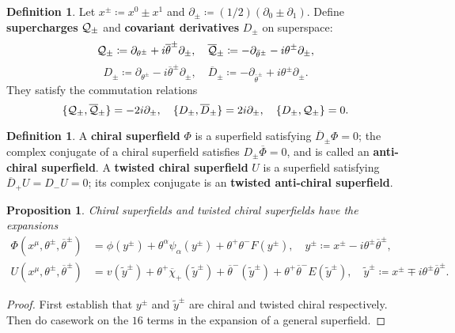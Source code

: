 \documentclass{report}
\theoremstyle{plain}
\newtheorem{proposition}[theorem]{Proposition}
\theoremstyle{definition}
\newtheorem{definition}[theorem]{Definition}
\theoremstyle{remark}
\newcommand{\di}{\partial}
\newcommand{\cnj}{\overline}
\begin{document}
\begin{definition}
  Let $x^\pm \coloneqq x^0 \pm x^1$ and $\di_\pm \coloneqq (1/2)(\di_0
  \pm \di_1)$. Define {\bf supercharges} $\cal Q_\pm$ and {\bf
    covariant derivatives} $D_\pm$ on superspace:
  \[ {\cal Q}_\pm \coloneqq \di_{\theta^\pm} + i \cnj{\theta}^\pm \di_\pm, \quad \cnj{\cal Q}_\pm \coloneqq -\di_{\bar\theta^\pm} - i\theta^\pm \di_\pm, \]
  \[ D_\pm \coloneqq \di_{\theta^\pm} - i\cnj\theta^\pm \di_\pm, \quad \cnj D_\pm \coloneqq -\di_{\bar\theta^\pm} + i\theta^\pm \di_\pm. \]
  They satisfy the commutation relations
  \[ \{{\cal Q}_\pm, \cnj{\cal Q}_\pm\} = -2i\di_\pm, \quad \{D_\pm, \cnj D_\pm\} = 2i\di_\pm, \quad \{D_\pm, {\cal Q}_\pm\} = 0. \]
\end{definition}

\begin{definition}
  A {\bf chiral superfield} $\Phi$ is a superfield satisfying $\cnj
  D_\pm \Phi = 0$; the complex conjugate of a chiral superfield
  satisfies $D_\pm \cnj\Phi = 0$, and is called an {\bf anti-chiral
    superfield}. A {\bf twisted chiral superfield} $U$ is a superfield
  satisfying $\cnj D_+ U = D_- U = 0$; its complex conjugate is an
  {\bf twisted anti-chiral superfield}.
\end{definition}

\begin{proposition} \label{thm:chiral-superfield-expansion}
  Chiral superfields and twisted chiral superfields have the
  expansions
  \begin{align*}
    \Phi(x^\mu, \theta^\pm, \cnj\theta^\pm) &= \phi(y^\pm) + \theta^\alpha \psi_\alpha(y^\pm) + \theta^+\theta^-F(y^\pm), \quad y^\pm \coloneqq x^\pm - i\theta^\pm \cnj\theta^\pm, \\
    U(x^\mu, \theta^\pm, \cnj\theta^\pm) &= v(\tilde y^\pm) + \theta^+ \cnj\chi_+(\tilde y^\pm) + \cnj\theta^-(\tilde y^\pm) + \theta^+ \cnj\theta^- E(\tilde y^\pm), \quad \tilde y^\pm \coloneqq x^\pm \mp i\theta^\pm \cnj\theta^\pm.
  \end{align*}
\end{proposition}

\begin{proof}
  First establish that $y^\pm$ and $\tilde y^\pm$ are chiral and
  twisted chiral respectively. Then do casework on the $16$ terms in
  the expansion of a general superfield.
\end{proof}
\end{document}
